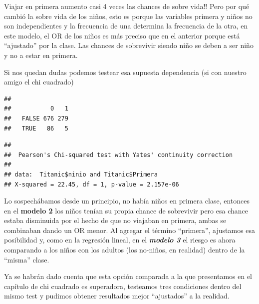 \documentclass[
]{book}
\newenvironment{Shaded}{\begin{snugshade}}{\end{snugshade}}
\newcommand{\FunctionTok}[1]{\textcolor[rgb]{0.00,0.00,0.00}{#1}}
\newcommand{\NormalTok}[1]{#1}
\newcommand{\SpecialCharTok}[1]{\textcolor[rgb]{0.00,0.00,0.00}{#1}}
\begin{document}
Viajar en primera aumento casi 4 veces las chances de sobre vida!!
Pero por qué cambió la sobre vida de los niños, esto es porque las variables primera y niños no son independientes y la frecuencia de una determina la frecuencia de la otra, en este modelo, el OR de los niños es más preciso que en el anterior porque está ``ajustado'' por la clase. Las chances de sobrevivir siendo niño se deben a ser niño y no a estar en primera.

Si nos quedan dudas podemos testear esa supuesta dependencia (si con nuestro amigo el chi cuadrado)

\begin{Shaded}
\end{Shaded}

\begin{verbatim}
##        
##           0   1
##   FALSE 676 279
##   TRUE   86   5
\end{verbatim}

\begin{Shaded}
\end{Shaded}

\begin{verbatim}
## 
##  Pearson's Chi-squared test with Yates' continuity correction
## 
## data:  Titanic$ninio and Titanic$Primera
## X-squared = 22.45, df = 1, p-value = 2.157e-06
\end{verbatim}

Lo sospechábamos desde un principio, no había niños en primera clase, entonces en el \textbf{modelo 2} los niños tenían su propia chance de sobrevivir pero esa chance estaba disminuida por el hecho de que no viajaban en primera, ambas se combinaban dando un OR menor. Al agregar el término ``primera'', ajustamos esa posibilidad y, como en la regresión lineal, en el \textbf{\emph{modelo 3}} el riesgo es ahora comparando a los niños con los adultos (los no-niños, en realidad) dentro de la ``misma'' clase.

Ya se habrán dado cuenta que esta opción comparada a la que presentamos en el capítulo de chi cuadrado es superadora, testeamos tres condiciones dentro del mismo test y pudimos obtener resultados mejor ``ajustados'' a la realidad.
\end{document}
